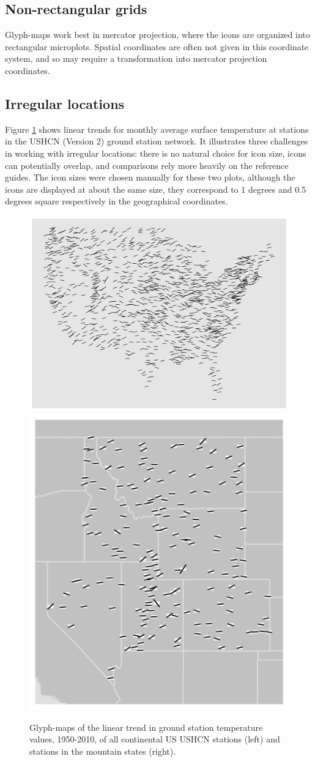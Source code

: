 \documentclass[oneside]{article}
\begin{document}
\subsection{Non-rectangular grids}

Glyph-maps work best in mercator projection, where the icons are organized into rectangular microplots. Spatial coordinates are often not given in this coordinate system, and so may require a transformation into mercator projection coordinates.

\subsection{Irregular locations}
Figure \ref{fig:irregular} shows linear trends for monthly average surface temperature at stations in the USHCN (Version 2) ground station network.  It illustrates three challenges in working with irregular locations: there is no natural choice for icon size, icons can potentially overlap, and comparisons rely more heavily on the reference guides.  The icon sizes were chosen manually for these two plots, although the icons are displayed at about the same size, they correspond to 1 degrees and 0.5 degrees square respectively in the geographical coordinates. 
\begin{figure}[htbp]
  \centering
  \includegraphics[width=0.55\linewidth]{usa-lin-overlap}%
  \includegraphics[width=0.35\linewidth]{ghcn-mountains}%
  \caption{Glyph-maps of the linear trend in ground station temperature values, 1950-2010, of all continental US USHCN stations (left) and stations in the mountain states (right).} 
  \label{fig:irregular}
\end{figure}
\end{document}
